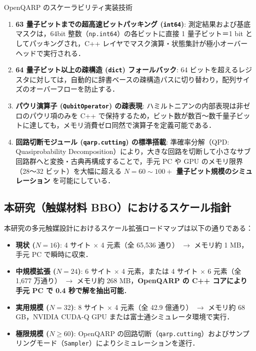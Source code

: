\documentclass[11pt,a4paper]{ltjsarticle}
\begin{document}
\begin{keybox}{OpenQARP のスケーラビリティ実装技術}
\begin{enumerate}\setlength{\itemsep}{1mm}
    \item \textbf{63 量子ビットまでの超高速ビットパッキング (\texttt{int64})}:
    測定結果および基底マスクは，64bit 整数（\texttt{np.int64}）の各ビットに直接 1 量子ビット＝1 bit としてパッキングされ，C++ レイヤでマスク演算・状態集計が極小オーバーヘッドで実行される．
    \item \textbf{64 量子ビット以上の疎構造 (\texttt{dict}) フォールバック}:
    64 ビットを超えるレジスタに対しては，自動的に辞書ベースの疎構造パスに切り替わり，配列サイズのオーバーフローを防止する．
    \item \textbf{パウリ演算子 (\texttt{QubitOperator}) の疎表現}:
    ハミルトニアンの内部表現は非ゼロのパウリ項のみを C++ で保持するため，ビット数が数百〜数千量子ビットに達しても，メモリ消費ゼロ同然で演算子を定義可能である．
    \item \textbf{回路切断モジュール (\texttt{qarp.cutting}) の標準搭載}:
    準確率分解（QPD: Quasiprobability Decomposition）により，大きな回路を切断して小さなサブ回路群へと変換・古典再構成することで，手元 PC や GPU のメモリ限界（28〜32 ビット）を大幅に超える \textbf{$N = 60 \sim 100+$ 量子ビット規模のシミュレーション} を可能にしている．
\end{enumerate}
\end{keybox}

\subsection{本研究（触媒材料 BBO）におけるスケール指針}
本研究の多元触媒設計におけるスケール拡張ロードマップは以下の通りである：
\begin{itemize}\setlength{\itemsep}{1mm}
    \item \textbf{現状 ($N=16$)}: 4 サイト $\times$ 4 元素（全 65,536 通り） $\to$ メモリ約 1 MB，手元 PC で瞬時に収束．
    \item \textbf{中規模拡張 ($N=24$)}: 6 サイト $\times$ 4 元素，または 4 サイト $\times$ 6 元素（全 1,677 万通り） $\to$ メモリ約 268 MB，\textbf{OpenQARP の C++ コアにより手元 PC で 0.4 秒で解を抽出可能}．
    \item \textbf{実用規模 ($N=32$)}: 8 サイト $\times$ 4 元素（全 42.9 億通り） $\to$ メモリ約 68 GB，NVIDIA CUDA-Q GPU または富士通シミュレータ環境で実行．
    \item \textbf{極限規模 ($N \ge 60$)}: OpenQARP の回路切断（\texttt{qarp.cutting}）およびサンプリングモード（\texttt{Sampler}）によりシミュレーションを遂行．
\end{itemize}
\end{document}
